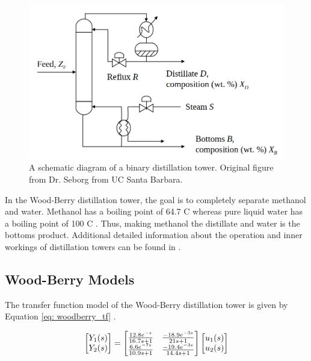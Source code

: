 \begin{figure}[h]
    \centering
    \includegraphics[scale=0.45]{images/woodberry.png}
    \caption{A schematic diagram of a binary distillation tower.  Original figure from Dr. Seborg from UC Santa Barbara.}
    \label{fig: woodberry}
\end{figure}

In the Wood-Berry distillation tower, the goal is to completely separate methanol and water.  Methanol has a boiling point of 64.7 \textdegree C whereas pure liquid water has a boiling point of 100 \textdegree C \cite{sonntag_thermo}. Thus, making methanol the distillate and water is the bottoms product. Additional detailed information about the operation and inner workings of distillation towers can be found in \cite{henry_distillation}.  

\subsection{Wood-Berry Models}
The transfer function model of the Wood-Berry distillation tower is given by Equation \ref{eq: woodberry_tf} \cite{mpc_for_distillation_tower}.

\begin{equation}
    \centering
    \begin{bmatrix}
        Y_1(s) \\
        Y_2(s) 
    \end{bmatrix}
    =
    \begin{bmatrix}
        \frac{12.8e^{-s}}{16.7s + 1}  & \frac{-18.9e^{-3s}}{21s + 1} \\
        \frac{6.6e^{-7s}}{10.9s + 1}  & \frac{-19.4e^{-3s}}{14.4s + 1} 
    \end{bmatrix}
    \begin{bmatrix}
        u_1(s) \\
        u_2(s)
    \end{bmatrix}
    \label{eq: woodberry_tf}
\end{equation}

